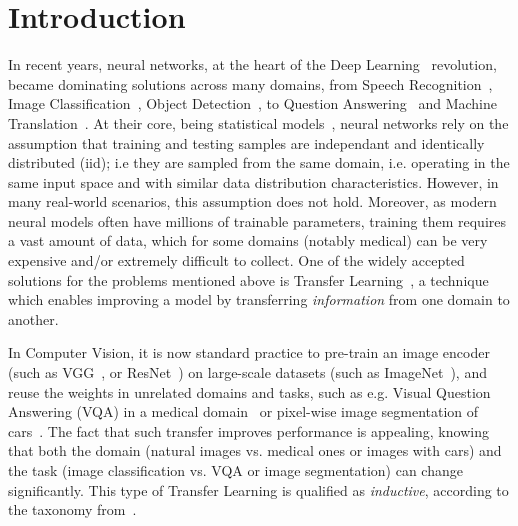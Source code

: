 \section{Introduction}
In recent years, neural networks, at the heart of the Deep Learning~\cite{lecun2015deep} revolution, became dominating solutions across many domains, from  Speech Recognition~\cite{graves2013speech}, Image Classification~\cite{krizhevsky2012imagenet}, Object Detection~\cite{redmon2016you}, to Question Answering~\cite{weston2014memory} and Machine Translation~\cite{bahdanau2014neural}.
At their core, being statistical models~\cite{ripley1993statistical,warner1996understanding}, neural networks rely on the assumption that training and testing samples are independant and identically distributed (iid); i.e they are sampled from the same domain, i.e. operating in the same input space and with similar data distribution characteristics.
However, in many real-world scenarios, this assumption does not hold. Moreover, as modern neural models often have  millions of trainable parameters, training them requires a vast amount of data, which for some domains (notably medical) can be very expensive and/or extremely difficult to collect.
One of the widely accepted solutions for the problems mentioned above is Transfer Learning~\cite{pan2009survey,weiss2016survey}, a technique which enables improving a model by transferring \emph{information} from one domain to another.


In Computer Vision, it is now standard practice to pre-train an image encoder (such as VGG~\cite{simonyan2014very}, or ResNet~\cite{he2016deep}) on large-scale datasets (such as ImageNet~\cite{deng2009imagenet}), and reuse the weights in unrelated domains and tasks, such as e.g. Visual Question Answering (VQA) in a medical domain~\cite{kornuta2019leveraging} or pixel-wise image segmentation of cars~\cite{iglovikov2018ternausnet}.
The fact that such transfer improves performance is appealing, knowing that both the domain (natural images vs. medical ones or images with cars) and the task (image classification vs. VQA or image segmentation) can change significantly. This type of Transfer Learning is qualified as \emph{inductive}, according to the taxonomy from~\cite{pan2009survey}.

